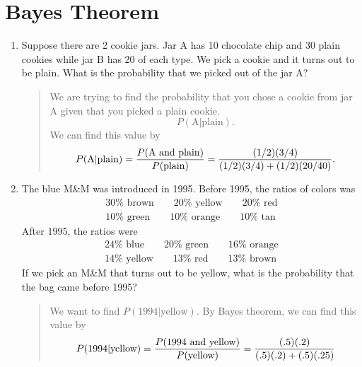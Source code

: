 \documentclass{hw}
\begin{document}
\section*{Bayes Theorem}
\begin{enumerate}
\item Suppose there are 2 cookie jars. Jar A has 10 chocolate chip and 30 plain cookies while jar
B has 20 of each type. We pick a cookie and it turns out to be plain. What is the probability that
we picked out of the jar A?
\begin{quote}
We are trying to find the probability that you chose a cookie from jar A given that you picked a
plain cookie.
\[
P(\text{A}|\text{plain}).
\]
We can find this value by
\[
P(\text{A}|\text{plain})=
{P(\text{A and plain})\over P(\text{plain})}=
{(1/2)(3/4)\over(1/2)(3/4)+(1/2)(20/40)}.
\]
\end{quote}
\item The blue M\&M was introduced in 1995. Before 1995, the ratios of colors was
\begin{gather*}
30\%\text{ brown}\qquad 20\%\text{ yellow}\qquad20\%\text{ red}\\
10\%\text{ green}\qquad 10\%\text{ orange}\qquad10\%\text{ tan}
\end{gather*}
After 1995, the ratios were
\begin{gather*}
24\%\text{ blue}\qquad 20\%\text{ green}\qquad16\%\text{ orange}\\
14\%\text{ yellow}\qquad 13\%\text{ red}\qquad13\%\text{ brown}
\end{gather*}
If we pick an M\&M that turns out to be yellow, what is the probability that the bag came before
1995?
\begin{quote}
We want to find $P(1994|\text{yellow})$. By Bayes theorem, we can find this value by
\[
P(1994|\text{yellow})=
{P(1994\text{ and yellow})\over P(\text{yellow})}=
{(.5)(.2)\over (.5)(.2)+(.5)(.25)}
\]
\end{quote}
\end{enumerate}
\end{document}
